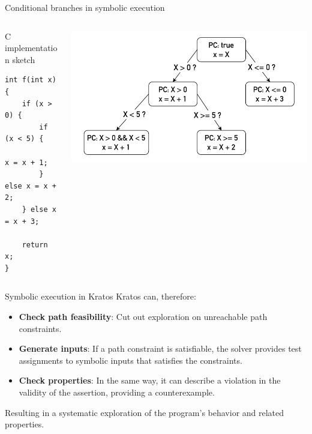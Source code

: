 \documentclass[aspectratio=1610,10.5pt]{beamer} %
\begin{document}
\begin{frame}[fragile]{Conditional branches in symbolic execution}
    \begin{columns}
        \begin{column}{0.32\textwidth}
            \begin{block}{C implementation sketch}
                    \begin{verbatim}
int f(int x) {
    if (x > 0) {
        if (x < 5) {
            x = x + 1;
        } else x = x + 2;
    } else x = x + 3;

    return x;
}
                    \end{verbatim}
            \end{block}
        \end{column}
        \begin{column}{0.70\textwidth}
            \includegraphics[height=%
            0.6\textheight]{../res/diagram-symexec}
        \end{column}
    \end{columns}
\end{frame}

\begin{frame}{Symbolic execution in Kratos}
    Kratos can, therefore:

    \begin{itemize}
        \item \textbf{Check path feasibility}: Cut out exploration on unreachable path constraints.

        \item \textbf{Generate inputs}: If a path constraint is satisfiable, the solver provides test assignments to symbolic inputs that satisfies the constraints.

        \item \textbf{Check properties}: In the same way, it can describe a violation in the validity of the assertion, providing a counterexample.
    \end{itemize}

    Resulting in a systematic exploration of the program's behavior and related properties.
\end{frame}
\end{document}
